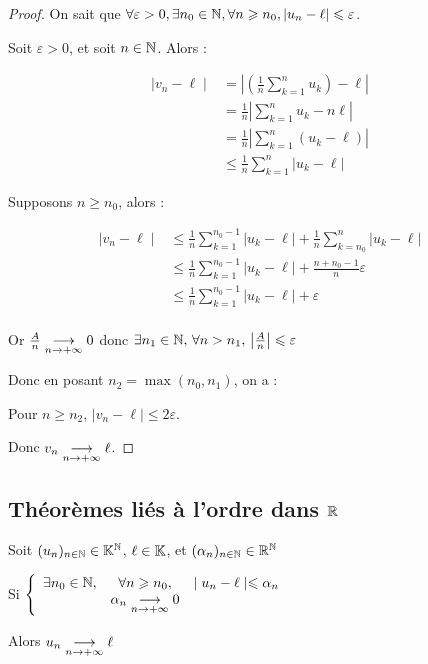 \begin{proof}
    On sait que $\forall \varepsilon > 0, \exists n_0 \in \mathbb{N}, \forall n \geqslant n_0, |u_n - \ell| \leqslant \varepsilon$.

    Soit $\varepsilon > 0$, et soit $n \in \mathbb{N}$. Alors : 

    \begin{align*}
         \mid v_n - \ell \mid &= \left| \left(\frac{1}{n} \sum_{k=1}^n u_k\right) - \ell \right| \\
        &= \frac{1}{n} \left| \sum_{k=1}^n u_k - n \ell \right| \\
        &= \frac{1}{n} \left| \sum_{k=1}^n (u_k - \ell) \right| \\
        &\leqslant \frac{1}{n} \sum_{k=1}^n |u_k - \ell|
    \end{align*}
    

    Supposons $n \geqslant n_0$, alors :

    \begin{align*}
        \mid v_n - \ell \mid & \leqslant  \frac 1 n \sum_{k=1}^{n_0 - 1} |u_k - \ell| + \frac 1 n \sum_{k=n_0}^n |u_k - \ell| \\
        & \leqslant  \frac 1 n \sum_{k=1}^{n_0 - 1} |u_k - \ell| + \frac {n + n_0 - 1} n \varepsilon \\
         & \leqslant  \frac 1 n \sum_{k=1}^{n_0 - 1} |u_k - \ell| + \varepsilon \\
    \end{align*}

    Or $\frac A n \underset{n \to +\infty}{\longrightarrow} 0$ donc $\exists n_1 \in \mathbb{N}, \, \forall n > n_1, \, \left| \frac A n \right| \leqslant \varepsilon $

    Donc en posant $n_2 = \max(n_0, n_1)$, on a : 

    Pour $n \geqslant n_2$, $\mid v_n - \ell \mid \leqslant 2\varepsilon$. 

    Donc $v_n \underset{n \to +\infty}{\longrightarrow} \ell$.
\end{proof}

\subsection{Théorèmes liés à l'ordre dans \texorpdfstring{$\mathbb{R}$}{R} }

\begin{theoreme}{}{}
    Soit $(u_n)_{n \in \mathbb{N}} \in \mathbb{K}^{\mathbb{N}}$, $\ell \in \mathbb{K}$, et $(\alpha_n)_{n \in \mathbb{N}} \in \mathbb{R}^{\mathbb{N}}$ 
    
    Si $\left\{ \begin{array}{lcl}
        \exists n_0 \in \mathbb{N}, & \forall n \geqslant n_0, & \mid u_n - \ell \mid \leqslant \alpha_n \\
        \space & \alpha_n \underset{n \to +\infty}{\longrightarrow} 0 & \space \\
    \end{array} \right.
    $

    Alors $u_n \underset{n \to +\infty}{\longrightarrow} \ell$
\end{theoreme}

